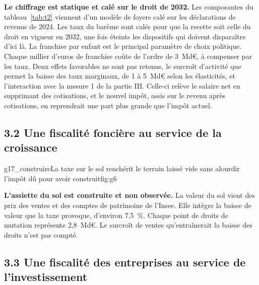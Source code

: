 \textbf{Le chiffrage est statique et calé sur le droit de 2032.} Les composantes du tableau~\ref{tab:t2} viennent d'un
modèle de foyers calé sur les déclarations de revenus de 2024. Les taux du barème sont calés pour que la recette soit
celle du droit en vigueur en 2032, une fois éteints les dispositifs qui doivent disparaître d'ici là. La franchise par
enfant est le principal paramètre de choix politique. Chaque millier d'euros de franchise coûte de l'ordre de 3~Md€, à
compenser par les taux. Deux effets favorables ne sont pas retenus, le surcroît d'activité que permet la baisse des taux
marginaux, de 1 à 5~Md€ selon les élasticités, et l'interaction avec la mesure 1 de la partie III. Celle-ci relève le
salaire net en supprimant des cotisations, et le nouvel impôt, assis sur le revenu après cotisations, en reprendrait une
part plus grande que l'impôt actuel.

\subsection{3.2 Une fiscalité foncière au service de la croissance}





%
{g17_construire}{La taxe sur le sol renchérit le terrain laissé vide sans alourdir l'impôt dû pour avoir construit}{fig:g6}




\textbf{L'assiette du sol est construite et non observée.} La valeur du sol vient des prix des ventes et des comptes de
patrimoine de l'Insee. Elle intègre la baisse de valeur que la taxe provoque, d'environ 7,5~\%. Chaque point de droits de
mutation représente 2,8~Md€. Le surcroît de ventes qu'entraînerait la baisse des droits n'est pas compté.

\subsection{3.3 Une fiscalité des entreprises au service de l'investissement}

